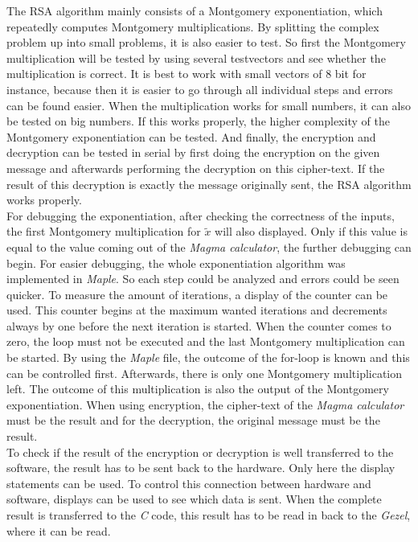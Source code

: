 \documentclass[a4paper]{article}
\begin{document}
The RSA algorithm mainly consists of a Montgomery exponentiation, which repeatedly computes Montgomery multiplications. By splitting the complex problem up into small problems, it is also easier to test. So first the Montgomery multiplication will be tested by using several testvectors and see whether the multiplication is correct. It is best to work with small vectors of 8 bit for instance, because then it is easier to go through all individual steps and errors can be found easier. When the multiplication works for small numbers, it can also be tested on big numbers. If this works properly, the higher complexity of the Montgomery exponentiation can be tested. And finally, the encryption and decryption can be tested in serial by first doing the encryption on the given message and afterwards performing the decryption on this cipher-text. If the result of this decryption is exactly the message originally sent, the RSA algorithm works properly.\\

For debugging the exponentiation, after checking the correctness of the inputs, the first Montgomery multiplication for $\tilde{x}$ will also displayed. Only if this value is equal to the value coming out of the \textit{Magma calculator}, the further debugging can begin. For easier debugging, the whole exponentiation algorithm was implemented in \textit{Maple}. So each step could be analyzed and errors could be seen quicker. To measure the amount of iterations, a display of the counter can be used. This counter begins at the maximum wanted iterations and decrements always by one before the next iteration is started. When the counter comes to zero, the loop must not be executed and the last Montgomery multiplication can be started. By using the \textit{Maple} file, the outcome of the for-loop is known and this can be controlled first. Afterwards, there is only one Montgomery multiplication left. The outcome of this multiplication is also the output of the Montgomery exponentiation. When using encryption, the cipher-text of the \textit{Magma calculator} must be the result and for the decryption, the original message must be the result.\\

To check if the result of the encryption or decryption is well transferred to the software, the result has to be sent back to the hardware. Only here the display statements can be used. To control this connection between hardware and software, displays can be used to see which data is sent. When the complete result is transferred to the \textit{C} code, this result has to be read in back to the \textit{Gezel}, where it can be read.
\end{document}
